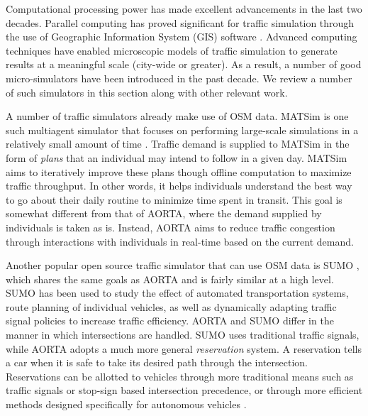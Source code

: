 \documentclass[letterpaper, 10 pt, conference]{ieeeconf}  %
\begin{document}

Computational processing power has made excellent advancements in the
last two decades. Parallel computing has proved significant for
traffic simulation through the use of Geographic Information System
(GIS) software \cite{pursula1999simulation}. Advanced computing
techniques have enabled microscopic models of traffic simulation to
generate results at a meaningful scale (city-wide or greater). As a
result, a number of good micro-simulators have been introduced in the
past decade. We review a number of such simulators in this section
along with other relevant work.

A number of traffic simulators already make use of OSM data. MATSim is one such
multiagent simulator that focuses on performing large-scale simulations in a
relatively small amount of time \cite{balmer2009matsim}. Traffic demand is
supplied to MATSim in the form of \textit{plans} that an individual may intend
to follow in a given day. MATSim aims to iteratively improve these plans though
offline computation to maximize traffic throughput. In other words, it helps
individuals understand the best way to go about their daily routine to minimize
time spent in transit. This goal is somewhat different from that of AORTA,
where the demand supplied by individuals is taken as is. Instead, AORTA aims to
reduce traffic congestion through interactions with individuals in real-time
based on the current demand.


Another popular open source traffic simulator that can use OSM data is SUMO
\cite{SUMO2011}, which shares the same goals as AORTA and is fairly similar at
a high level. SUMO has been used to study the effect of automated
transportation systems, route planning of individual vehicles, as well as
dynamically adapting traffic signal policies to increase traffic efficiency.
AORTA and SUMO differ in the manner in which intersections are handled. SUMO
uses traditional traffic signals, while AORTA adopts a much more general
\textit{reservation} system. A reservation tells a car when it is safe to take
its desired path through the intersection. Reservations can be allotted to
vehicles through more traditional means such as traffic signals or stop-sign
based intersection precedence, or through more efficient methods designed
specifically for autonomous vehicles \cite{JAIR08-dresner}.
\end{document}
